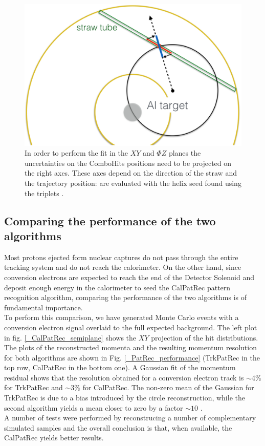 \documentclass[12pt,a4paper,openright, oneside, titlepage]{book} %
\begin{document}
\begin{figure}[h!]
\centering
\includegraphics[scale=0.3]{giani_TrkPatRec_errors}
\caption{In order to perform the fit in the $XY$ and $\Phi Z$ planes the uncertainties on the ComboHits positions need to be projected on the right axes. 
These axes depend on the direction of the straw and the trajectory position: are evaluated with the helix seed found using the triplets \cite{GianiPatRec:2020}.}
\label{_TrkPatRec_errors}
\end{figure}

\subsection{Comparing the performance of the two algorithms}
Most protons ejected form nuclear captures do not pass through the entire tracking system and do not reach the calorimeter. 
On the other hand, since conversion electrons are expected to reach the end of the Detector Solenoid and deposit enough energy in the calorimeter to seed the CalPatRec pattern recognition algorithm, comparing the performance of the two algorithms is of fundamental importance.\\
To perform this comparison, we have generated Monte Carlo events with a conversion electron signal overlaid to the full expected background\cite{GianiPatRec:2020}.
The left plot in fig. \ref{_CalPatRec_semiplane} shows the $XY$ projection of the hit distributions.
The plots of the reconstructed momenta and the resulting momentum resolution for both algorithms are shown in Fig. \ref{_PatRec_performance} (TrkPatRec in the top row, CalPatRec in the bottom one). 
A Gaussian fit of the momentum residual shows that the resolution obtained for a conversion electron track is $\sim 4\%$ for TrkPatRec and $\sim 3\%$ for CalPatRec. 
The non-zero mean of the Gaussian for TrkPatRec is due to a bias introduced by the circle reconstruction, while the second algorithm yields a mean closer to zero by a factor $\sim 10$  \cite{GianiPatRec:2016} \cite{GianiPatRec:2020}. \\
A number of tests were performed by reconstrucing a number of complementary simulated samples and the overall conclusion is that, when available, the CalPatRec yields better results.
\end{document}
